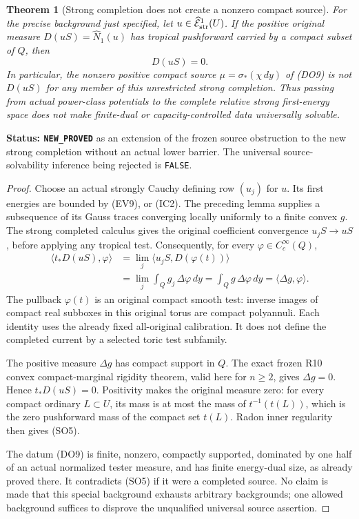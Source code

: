 \documentclass[11pt,a4paper]{article}
\numberwithin{equation}{section}
\newtheorem{theorem}{Theorem}[section]
\theoremstyle{definition}
\theoremstyle{remark}
\begin{document}
\begin{theorem}[Strong completion does not create a nonzero compact source]
\label{thm:r11-strong-completed-compact-source-obstruction}
For the precise background just specified, let
$u\in\widehat{\mathcal E}^{1}_{\rm str}(U)$.
If the positive original measure $D(uS)=\widehat N_1(u)$
has tropical pushforward carried by a compact subset of $Q$,
then
\[
                              D(uS)=0.
 \tag{SO5}
\]
In particular, the nonzero positive compact source
$\mu=\sigma_*(\chi\,dy)$ of (DO9) is not $D(uS)$ for
any member of this unrestricted strong completion.
Thus passing from actual power-class potentials to the complete
relative strong first-energy space does not make finite-dual or
capacity-controlled data universally solvable.
\end{theorem}

\noindent\textbf{Status: \texttt{NEW\_PROVED}} as an extension
of the frozen source obstruction to the new strong completion
without an actual lower barrier.  The universal source-solvability
inference being rejected is \texttt{FALSE}.

\begin{proof}
Choose an actual strongly Cauchy defining row $(u_j)$ for $u$.
Its first energies are bounded by (EV9), or (IC2).
The preceding lemma supplies a subsequence of its Gauss traces
converging locally uniformly to a finite convex $g$.
The strong completed calculus gives the original coefficient
convergence $u_jS\to uS$, before applying any tropical test.
Consequently, for every $\varphi\in C_c^\infty(Q)$,
\[
 \begin{split}
 \langle t_*D(uS),\varphi\rangle
   &=\lim_j\langle u_jS,D(\varphi(t))\rangle\\
   &=\lim_j\int_Qg_j\,\Delta\varphi\,dy
     =\int_Qg\,\Delta\varphi\,dy
     =\langle\Delta g,\varphi\rangle.
 \end{split}
 \tag{SO6}
\]
The pullback $\varphi(t)$ is an original compact smooth test:
inverse images of compact real subboxes in this original torus
are compact polyannuli.  Each identity uses the already fixed
all-original calibration.  It does not define the completed
current by a selected toric test subfamily.

The positive measure $\Delta g$ has compact support in $Q$.
The exact frozen R10 convex compact-marginal rigidity theorem,
valid here for $n\geq2$, gives $\Delta g=0$.
Hence $t_*D(uS)=0$.  Positivity makes the original measure zero:
for every compact ordinary $L\subset U$, its mass is at most
the mass of $t^{-1}(t(L))$, which is the zero pushforward
mass of the compact set $t(L)$.  Radon inner regularity
then gives (SO5).

The datum (DO9) is finite, nonzero, compactly supported,
dominated by one half of an actual normalized tester measure,
and has finite energy-dual size, as already proved there.
It contradicts (SO5) if it were a completed source.
No claim is made that this special background exhausts arbitrary
backgrounds; one allowed background suffices to disprove the
unqualified universal source assertion.
\end{proof}
\end{document}
